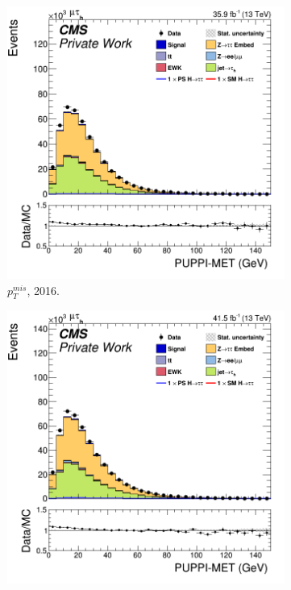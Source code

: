\begin{figure}
    \begin{subfigure}[b]{0.33\linewidth}
    \centering
    \includegraphics[width=\linewidth]{Chapitre7/Images/CtrlPlots/2016/PUPPImet.png} 
    \caption{$p^{mis}_T$, 2016.} 
    \vspace{0.5ex}
  \end{subfigure}%
  \begin{subfigure}[b]{0.33\linewidth}
    \centering
    \includegraphics[width=\linewidth]{Chapitre7/Images/CtrlPlots/2017/PUPPImet.png} 

\end{subfigure}
\end{figure}
